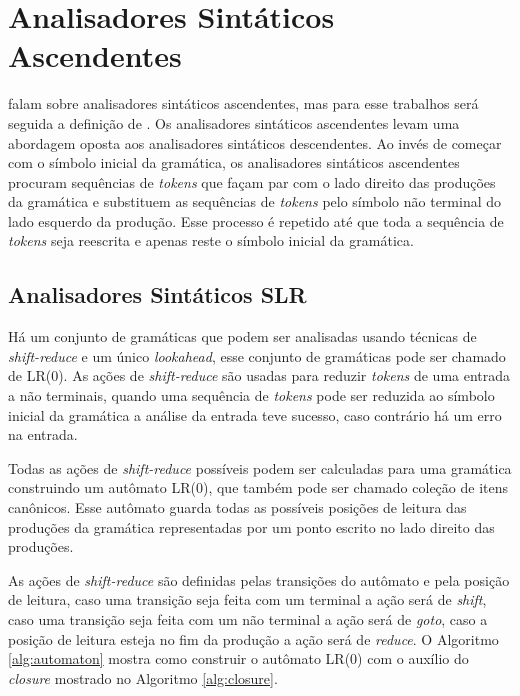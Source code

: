 \section{Analisadores Sintáticos Ascendentes}
\textcite{cooper2022engineering,mogensen2024introduction, thain2020introduction} falam sobre analisadores sintáticos ascendentes, mas para esse trabalhos será seguida a definição de \textcite{thain2020introduction}. Os analisadores sintáticos ascendentes levam uma abordagem oposta aos analisadores sintáticos descendentes. Ao invés de começar com o símbolo inicial da gramática, os analisadores sintáticos ascendentes procuram sequências de \textit{tokens} que façam par com o lado direito das produções da gramática e substituem as sequências de \textit{tokens} pelo símbolo não terminal do lado esquerdo da produção. Esse processo é repetido até que toda a sequência de \textit{tokens} seja reescrita e apenas reste o símbolo inicial da gramática.

\subsection{Analisadores Sintáticos SLR}
Há um conjunto de gramáticas que podem ser analisadas usando técnicas de \textit{shift-reduce} e um único \textit{lookahead}, esse conjunto de gramáticas pode ser chamado de LR(0). As ações de \textit{shift-reduce} são usadas para reduzir \textit{tokens} de uma entrada a não terminais, quando uma sequência de \textit{tokens} pode ser reduzida ao símbolo inicial da gramática a análise da entrada teve sucesso, caso contrário há um erro na entrada.

Todas as ações de \textit{shift-reduce} possíveis podem ser calculadas para uma gramática construindo um autômato LR(0), que também pode ser chamado coleção de itens canônicos. Esse autômato guarda todas as possíveis posições de leitura das produções da gramática representadas por um ponto escrito no lado direito das produções.

As ações de \textit{shift-reduce} são definidas pelas transições do autômato e pela posição de leitura, caso uma transição seja feita com um terminal a ação será de \textit{shift}, caso uma transição seja feita com um não terminal a ação será de \textit{goto}, caso a posição de leitura esteja no fim da produção a ação será de \textit{reduce}. O Algoritmo \ref{alg:automaton} mostra como construir o autômato LR(0) com o auxílio do \textit{closure} mostrado no Algoritmo \ref{alg:closure}.

